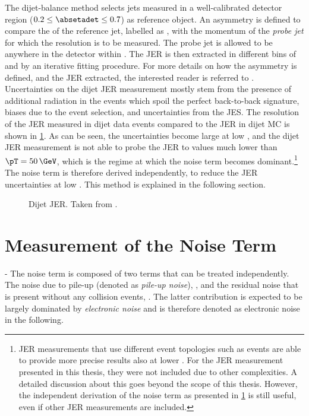 The dijet-balance method selects jets measured in a well-calibrated detector region ($0.2 \leq \absetadet \leq 0.7$) as reference object. An asymmetry is defined to compare the \pT of the reference jet, labelled as \pTref, with the momentum of the \emph{probe jet} for which the resolution is to be measured. The probe jet is allowed to be anywhere in the detector within .
The JER is then extracted in different bins of \pTref and \etadet by an iterative fitting procedure. For more details on how the asymmetry is defined, and the JER extracted, the interested reader is referred to . Uncertainties on the dijet JER measurement mostly stem from the presence of additional radiation in the events which spoil the perfect back-to-back signature, biases due to the event selection, and uncertainties from the JES.
The resolution of the JER measured in dijet data events compared to the JER in dijet MC is shown in \cref{fig:insitu-jer-dijet-only}.
As can be seen, the uncertainties become large at low \pT, and the dijet JER measurement is not able to probe the JER to values much lower than $\pT = 50\,\GeV$, which is the regime at which the noise term becomes dominant.\footnote{JER measurements that use different event topologies such as \Zjets events are able to provide more precise results also at lower \pT. For the JER measurement presented in this thesis, they were not included due to other complexities. A detailed discussion about this goes beyond the scope of this thesis. However, the independent derivation of the noise term as presented in \cref{sec:noise-term-meas} is still useful, even if other JER measurements are included.}
The noise term is therefore derived independently, to reduce the JER uncertainties at low \pT. This method is explained in the following section.

\FloatBarrier
\begin{figure}
    \caption{Dijet JER. Taken from .}
    \label{fig:insitu-jer-dijet-only}
\end{figure}


\section{Measurement of the Noise Term}
\label{sec:noise-term-meas}
- The noise term is composed of two terms that can be treated independently. The noise due to pile-up (denoted as \emph{pile-up noise}), \Npileup, and the residual noise that is present without any collision events, \Nmuzero. The latter contribution is expected to be largely dominated by \emph{electronic noise} and is therefore denoted as electronic noise in the following.

